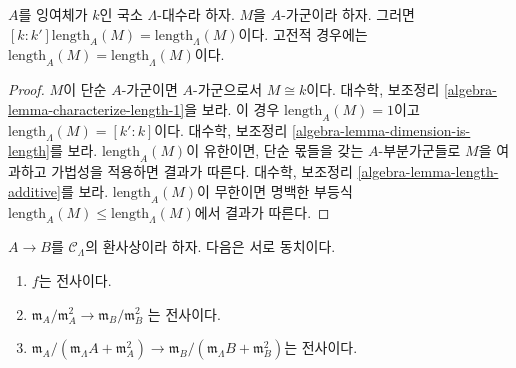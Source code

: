 \begin{lemma}
\label{lemma-length}
$A$를 잉여체가 $k$인 국소 $\Lambda$-대수라 하자.
$M$을 $A$-가군이라 하자. 그러면
$[k : k'] \text{length}_A(M) = \text{length}_\Lambda(M)$이다.
고전적 경우에는
$\text{length}_A(M) = \text{length}_\Lambda(M)$이다.
\end{lemma}

\begin{proof}
$M$이 단순 $A$-가군이면 $A$-가군으로서 $M \cong k$이다. 대수학,
보조정리 \ref{algebra-lemma-characterize-length-1}을 보라.
이 경우 $\text{length}_A(M) = 1$이고
$\text{length}_\Lambda(M) = [k' : k]$이다. 대수학, 보조정리
\ref{algebra-lemma-dimension-is-length}를 보라.
$\text{length}_A(M)$이 유한이면, 단순 몫들을 갖는 $A$-부분가군들로
$M$을 여과하고 가법성을 적용하면 결과가 따른다. 대수학, 보조정리
\ref{algebra-lemma-length-additive}를 보라.
$\text{length}_A(M)$이 무한이면 명백한 부등식
$\text{length}_A(M) \leq \text{length}_\Lambda(M)$에서 결과가 따른다.
\end{proof}

\begin{lemma}
\label{lemma-surjective}
$A \to B$를 $\mathcal{C}_\Lambda$의 환사상이라 하자.
다음은 서로 동치이다.
\begin{enumerate}
\item $f$는 전사이다.
\item $\mathfrak m_A/\mathfrak m_A^2 \to \mathfrak m_B/\mathfrak m_B^2$
는 전사이다.
\item $\mathfrak m_A/(\mathfrak m_\Lambda A + \mathfrak m_A^2)
\to \mathfrak m_B/(\mathfrak m_\Lambda B + \mathfrak m_B^2)$는 전사이다.
\end{enumerate}
\end{lemma}


